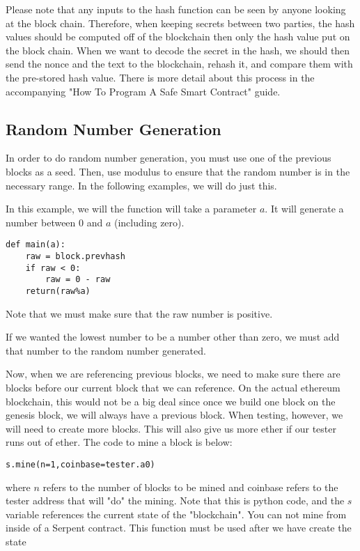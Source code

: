 \documentclass[12pt]{article}
\begin{document}
Please note that any inputs to the hash function can be seen by anyone looking at the block chain. Therefore, when keeping secrets between two parties, the hash values should be computed off of the blockchain then only the hash value put on the block chain. When we want to decode the secret in the hash, we should then send the nonce and the text to the blockchain, rehash it, and compare them with the pre-stored hash value. There is more detail about this process in the accompanying "How To Program A Safe Smart Contract" guide.

\subsection{Random Number Generation}
In order to do random number generation, you must use one of the previous blocks as a seed. Then, use modulus to ensure that the random number is in the necessary range. In the following examples, we will do just this.

In this example, we will the function will take a parameter $a$. It will generate a number between 0 and $a$ (including zero).

\begin{verbatim}
def main(a):
	raw = block.prevhash
	if raw < 0:
		raw = 0 - raw
	return(raw%a)
\end{verbatim}

Note that we must make sure that the raw number is positive. \cite{PeterBorah2014}

If we wanted the lowest number to be a number other than zero, we must add that number to the random number generated. 

Now, when we are referencing previous blocks, we need to make sure there are blocks before our current block that we can reference. On the actual ethereum blockchain, this would not be a big deal since once we build one block on the genesis block, we will always have a previous block. When testing, however, we will need to create more blocks. This will also give us more ether if our tester runs out of ether. The code to mine a block is below:

\begin{verbatim}
s.mine(n=1,coinbase=tester.a0)
\end{verbatim}

where $n$ refers to the number of blocks to be mined and coinbase refers to the tester address that will "do" the mining. Note that this is python code, and the $s$ variable references the current state of the "blockchain". You can not mine from inside of a Serpent contract. This function must be used after we have create the state \cite{Usingpyethereum.tester}
\end{document}
